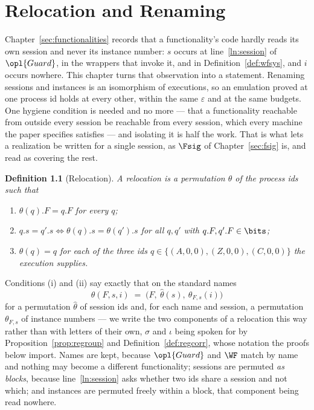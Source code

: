 \documentclass[10pt,oneside,openany]{book}
\theoremstyle{accentdef}
\newtheorem{definition}{Definition}[chapter]
\theoremstyle{accentplain}
\begin{document}
\chapter{Relocation and Renaming}\label{sec:reloc}

Chapter~\ref{sec:functionalities} records that a functionality's code hardly reads its own session
and never its instance number: $s$ occurs at line~\ref{ln:session} of $\opl{Guard}$, in the
wrappers that invoke it, and in Definition~\ref{def:wfsys}, and $i$ occurs nowhere. This chapter
turns that observation into a statement. Renaming sessions and instances is an isomorphism of
executions, so an emulation proved at one process id holds at every other, within the same
$\varepsilon$ and at the same budgets. One hygiene condition is needed and no more --- that a
functionality reachable from outside every session be reachable from every session, which every
machine the paper specifies satisfies --- and isolating it is half the work. That is what lets a realization be
written for a single session, as $\Fsig$ of Chapter~\ref{sec:fsig} is, and read as covering the rest.

\begin{definition}[Relocation]\label{def:reloc}
A \emph{relocation} is a permutation $\theta$ of the process ids such that
\begin{enumerate}[label=(\roman*),leftmargin=2.2em]
  \item $\theta(q).F = q.F$ for every $q$;
  \item $q.s = q'.s \iff \theta(q).s = \theta(q').s$ for all $q,q'$ with $q.F, q'.F \in \bits$;
  \item $\theta(q) = q$ for each of the three ids $q \in \{(A,0,0),(Z,0,0),(C,0,0)\}$ the execution
        supplies.
\end{enumerate}
\end{definition}

Conditions (i) and (ii) say exactly that on the standard names
\[
  \theta(F,s,i) \;=\; \bigl(F,\ \hat\theta(s),\ \theta_{F,s}(i)\bigr)
\]
for a permutation $\hat\theta$ of session ids and, for each name and session, a permutation
$\theta_{F,s}$ of instance numbers --- we write the two components of a relocation this way rather
than with letters of their own, $\sigma$ and $\iota$ being spoken for by
Proposition~\ref{prop:regroup} and Definition~\ref{def:regcorr}, whose notation the proofs below
import. Names are kept, because $\opl{Guard}$ and $\WF$ match by name and
nothing may become a different functionality; sessions are permuted \emph{as blocks}, because
line~\ref{ln:session} asks whether two ids share a session and not which; and instances are
permuted freely within a block, that component being read nowhere.
\end{document}
